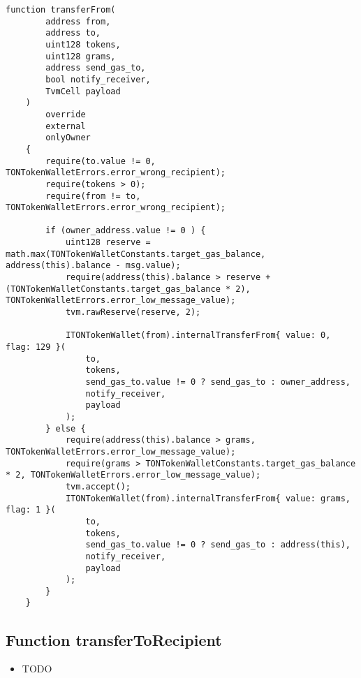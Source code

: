 \begin{lstlisting}[firstnumber=317]
    function transferFrom(
        address from,
        address to,
        uint128 tokens,
        uint128 grams,
        address send_gas_to,
        bool notify_receiver,
        TvmCell payload
    )
        override
        external
        onlyOwner
    {
        require(to.value != 0, TONTokenWalletErrors.error_wrong_recipient);
        require(tokens > 0);
        require(from != to, TONTokenWalletErrors.error_wrong_recipient);

        if (owner_address.value != 0 ) {
            uint128 reserve = math.max(TONTokenWalletConstants.target_gas_balance, address(this).balance - msg.value);
            require(address(this).balance > reserve + (TONTokenWalletConstants.target_gas_balance * 2), TONTokenWalletErrors.error_low_message_value);
            tvm.rawReserve(reserve, 2);

            ITONTokenWallet(from).internalTransferFrom{ value: 0, flag: 129 }(
                to,
                tokens,
                send_gas_to.value != 0 ? send_gas_to : owner_address,
                notify_receiver,
                payload
            );
        } else {
            require(address(this).balance > grams, TONTokenWalletErrors.error_low_message_value);
            require(grams > TONTokenWalletConstants.target_gas_balance * 2, TONTokenWalletErrors.error_low_message_value);
            tvm.accept();
            ITONTokenWallet(from).internalTransferFrom{ value: grams, flag: 1 }(
                to,
                tokens,
                send_gas_to.value != 0 ? send_gas_to : address(this),
                notify_receiver,
                payload
            );
        }
    }
\end{lstlisting}

\subsection{Function transferToRecipient}

\noindent\begin{itemize}
\item TODO
\end{itemize}

